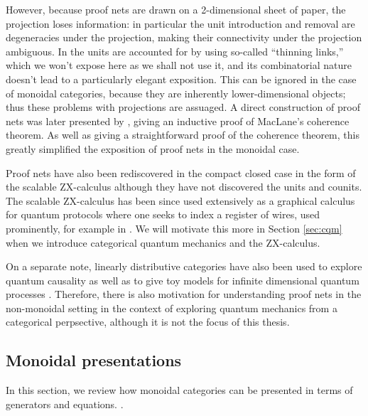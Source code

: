 However, because proof nets are drawn on a 2-dimensional sheet of paper, the projection loses information: in particular the unit introduction and removal are degeneracies under the projection, making their connectivity  under the projection ambiguous. In \cite{ldc} the units are accounted for by using so-called ``thinning links,'' which we won't expose here as we shall not use it, and its combinatorial nature doesn't lead to a particularly elegant exposition.  This can be ignored in the case of monoidal categories, because they are inherently lower-dimensional objects; thus these problems with projections are assuaged. A direct construction of proof nets was later presented by \cite{wilson}, giving an inductive proof of MacLane's coherence theorem.  As well as giving a straightforward proof of the coherence theorem, this greatly simplified the exposition of proof nets in the monoidal case.

Proof nets have also been rediscovered in the compact closed case in the form of the scalable ZX-calculus \cite{szx} although they have not discovered the units and counits.  The scalable ZX-calculus has been since used extensively as a graphical calculus for quantum protocols where one seeks to index a register of wires, used prominently, for example in \cite{szxi,szxii}.  We will motivate this more in Section \ref{sec:cqm} when we introduce categorical quantum mechanics and the ZX-calculus.

On a separate note, linearly distributive categories have also been used to explore quantum causality \cite{sander} as well as to give toy models for infinite dimensional quantum processes  \cite{muc}.  Therefore, there is also motivation for understanding proof nets in the non-monoidal setting in the context of exploring quantum mechanics from a categorical perpsective, although it is not the focus of this thesis.


\subsection{Monoidal presentations}
In this section, we review how monoidal categories can be presented in terms of generators and equations. .






